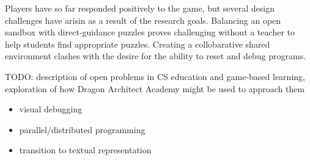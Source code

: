\documentclass{sig-alternate}
\newcommand{\TODO}[1]{{\color{red} TODO: #1}}
\newcommand{\gametitle}{{\color{RoyalPurple} Dragon Architect Academy}}
\begin{document}
Players have so far responded positively to the game, but several design challenges have arisin as a result of the research goals.
Balancing an open sandbox with direct-guidance puzzles proves challenging without a teacher to help students find appropriate puzzles.
Creating a collobarative shared environment clashes with the desire for the ability to reset and debug programs.

\TODO{description of open problems in CS education and game-based learning, exploration of how \gametitle{} might be used to approach them}
\begin{itemize}
\item visual debugging
\item parallel/distributed programming
\item transition to textual representation
\end{itemize}



 
\end{document}
